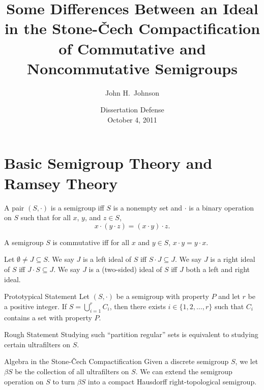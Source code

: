 \documentclass{beamer}
\title{Some Differences Between an Ideal in the Stone-\v{C}ech Compactification of Commutative and Noncommutative Semigroups}
\author{John H.~Johnson}
\institute{
  Howard University\\
  Washington, DC
}
\date{
  Dissertation Defense\\
  October 4, 2011
}
\begin{document}
\begin{frame}
  \titlepage
\end{frame}

\section{Basic Semigroup Theory and Ramsey Theory}
\begin{frame}
  \begin{definition}
    A pair $(S, \cdot)$ is a \alert{semigroup} iff $S$ is a nonempty set and $\cdot$ is a binary operation on $S$ such that for all $x$, $y$, and $z \in S$, 
    \[
      x\cdot ( y \cdot z) = (x \cdot y) \cdot z.
    \]
  \end{definition}
  
  \pause

  \begin{definition}
    A semigroup $S$ is \alert{commutative} iff for all $x$ and $y \in S$, $x \cdot y = y \cdot x$. 
  \end{definition}

  \pause
  
  \begin{definition}
    Let $\emptyset \ne J \subseteq S$. 
    We say $J$ is a \alert{left ideal of $S$} iff $S\cdot J \subseteq J$.
    \pause
    We say $J$ is a \alert{right ideal of $S$} iff $J\cdot S \subseteq J$.
    \pause
    We say $J$ is a \alert{(two-sided) ideal of $S$} iff $J$ both a left and right ideal. 
  \end{definition}  
\end{frame}

\begin{frame}
  \begin{block}{Prototypical Statement}
    Let $(S, \cdot)$ be a semigroup with property $P$ and let $r$ be a positive integer.
    If $S = \bigcup_{i=1}^r C_i$, then there exists $i \in \{1, 2, \ldots, r\}$ such that $C_i$ contains a set with property $P$. 
  \end{block}

  \pause

  \begin{block}{Rough Statement}
    Studying such ``partition regular'' sets is equivalent to studying
    certain ultrafilters on $S$. 
  \end{block}

  \pause

  \begin{block}{Algebra in the Stone-\v{C}ech Compactification}
    Given a discrete semigroup $S$, we let $\beta S$ be the collection
    of all ultrafilters on $S$.
    We can extend the semigroup operation on $S$ to turn $\beta S$
    into a compact Hausdorff right-topological semigroup. 
  \end{block}
\end{frame}
\end{document}
